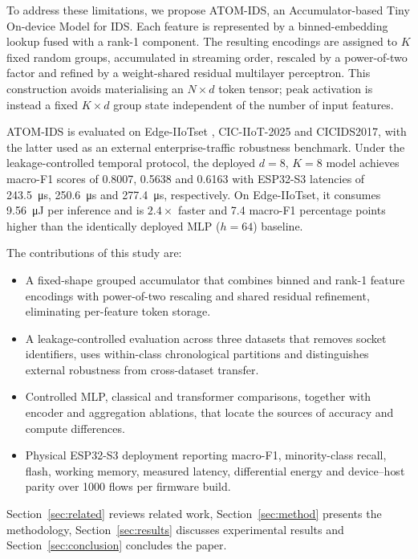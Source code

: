 \documentclass[10pt,letterpaper,twocolumn]{article}
\begin{document}
To address these limitations, we propose ATOM-IDS, an Accumulator-based Tiny
On-device Model for IDS. Each feature is represented by a binned-embedding
lookup \cite{gorishniy2022embeddings} fused with a rank-1 component. The
resulting encodings are assigned to $K$ fixed random groups, accumulated in
streaming order, rescaled by a power-of-two factor and refined by a
weight-shared residual multilayer perceptron. This construction avoids
materialising an $N \times d$ token tensor; peak activation is instead a fixed
$K \times d$ group state independent of the number of input features.

ATOM-IDS is evaluated on Edge-IIoTset \cite{ferrag2022edgeiiotset},
CIC-IIoT-2025 \cite{firouzi2025datasense} and CICIDS2017, with the latter used
as an external enterprise-traffic robustness benchmark. Under the
leakage-controlled temporal protocol, the deployed $d=8$, $K=8$ model achieves
macro-F1 scores of 0.8007, 0.5638 and 0.6163 with ESP32-S3 latencies of
\SI{243.5}{\micro\second}, \SI{250.6}{\micro\second} and
\SI{277.4}{\micro\second}, respectively. On Edge-IIoTset, it consumes
\SI{9.56}{\micro\joule} per inference and is $2.4\times$ faster and 7.4
macro-F1 percentage points higher than the identically deployed MLP ($h=64$)
baseline.

The contributions of this study are:

\begin{itemize}
\item A fixed-shape grouped accumulator that combines binned and rank-1 feature
encodings with power-of-two rescaling and shared residual refinement,
eliminating per-feature token storage.

\item A leakage-controlled evaluation across three datasets that removes
socket identifiers, uses within-class chronological partitions and distinguishes
external robustness from cross-dataset transfer.

\item Controlled MLP, classical and transformer comparisons, together with
encoder and aggregation ablations, that locate the sources of accuracy and
compute differences.

\item Physical ESP32-S3 deployment reporting macro-F1, minority-class recall,
flash, working memory, measured latency, differential energy and device--host
parity over 1000 flows per firmware build.
\end{itemize}

Section~\ref{sec:related} reviews related work, Section~\ref{sec:method}
presents the methodology, Section~\ref{sec:results} discusses
experimental results and Section~\ref{sec:conclusion} concludes the paper.
\end{document}
